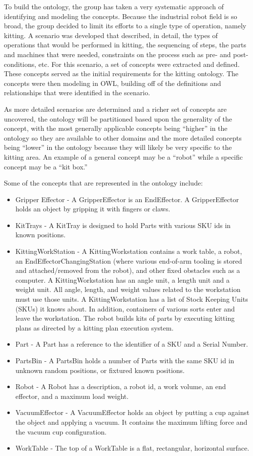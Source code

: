 \documentclass[a4paper, 10pt, conference]{ieeeconf}      %
\begin{document}
To build the ontology, the group has taken a very systematic approach of identifying and modeling the concepts. Because the industrial robot field is so broad, the group decided to limit its efforts to a single type of operation, namely kitting. A scenario was developed that described, in detail, the types of operations that would be performed in kitting, the sequencing of steps, the parts and machines that were needed, constraints on the process such as pre- and post-conditions, etc. For this scenario, a set of concepts were extracted and defined. These concepts served as the initial requirements for the kitting ontology. The concepts were then modeling in OWL, building off of the definitions and relationships that were identified in the scenario. 

As more detailed scenarios are determined and a richer set of concepts are uncovered, the ontology will be partitioned based upon the generality of the concept, with the most generally applicable concepts being ``higher'' in the ontology so they are available to other domains and the more detailed concepts being ``lower'' in the ontology because they will likely be very specific to the kitting area. An example of a general concept may be a ``robot'' while a specific concept may be a ``kit box.''

Some of the concepts that are represented in the ontology include:
\begin{itemize}
\item	Gripper Effector - A GripperEffector is an EndEffector. A GripperEffector holds an object by gripping it with fingers or claws.
\item	KitTrays - A KitTray is designed to hold Parts with various SKU ids in known positions.
\item	KittingWorkStation - A KittingWorkstation contains a work table, a robot, an EndEffectorChangingStation (where various end-of-arm tooling is stored and attached/removed from the robot), and other fixed obstacles such as a computer. A KittingWorkstation has an angle unit, a length unit and a weight unit. All angle, length, and weight values related to the workstation must use those units. A KittingWorkstation has a list of Stock Keeping Units (SKUs) it knows about. In addition, containers of various sorts enter and leave the workstation.  The robot builds kits of parts by executing kitting plans as directed by a kitting plan execution system.
\item	Part - A Part has a reference to the identifier of a SKU and a Serial Number.
\item	PartsBin - A PartsBin holds a number of Parts with the same SKU id in unknown random positions, or fixtured known positions.
\item	Robot - A Robot has a description, a robot id, a work volume, an end effector, and a maximum load weight.
\item	VacuumEffector - A VacuumEffector holds an object by putting a cup against the object and applying a vacuum. It contains the maximum lifting force and the vacuum cup configuration.
\item	 WorkTable - The top of a WorkTable is a flat, rectangular, horizontal surface.
\end{itemize}
\end{document}
